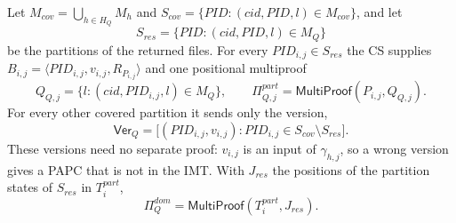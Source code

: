 


Let $M_{cov} = \bigcup_{h \in H_Q} M_h$ and $S_{cov} = \{PID : (cid,PID,l) \in M_{cov}\}$, and let
\begin{equation}
S_{res} = \{PID : (cid,PID,l) \in M_Q\}
\end{equation}
be the partitions of the returned files. For every $PID_{i,j} \in S_{res}$ the CS supplies
$B_{i,j} = \langle PID_{i,j}, v_{i,j}, R_{P_{i,j}} \rangle$ and one positional multiproof
\begin{equation}
Q_{Q,j} = \{ l : (cid, PID_{i,j}, l) \in M_Q \}, \qquad
\Pi^{part}_{Q,j} = \mathsf{MultiProof}(P_{i,j}, Q_{Q,j}).
\end{equation}
For every other covered partition it sends only the version,
\begin{equation}
\mathsf{Ver}_Q = \big[(PID_{i,j}, v_{i,j}) : PID_{i,j} \in S_{cov} \setminus S_{res}\big].
\end{equation}
These versions need no separate proof: $v_{i,j}$ is an input of $\gamma_{h,j}$, so a wrong version gives a
PAPC that is not in the IMT. With $J_{res}$ the positions of the partition states of $S_{res}$ in
$T^{part}_i$,
\begin{equation}
\Pi^{dom}_Q = \mathsf{MultiProof}(T^{part}_i, J_{res}).
\end{equation}


